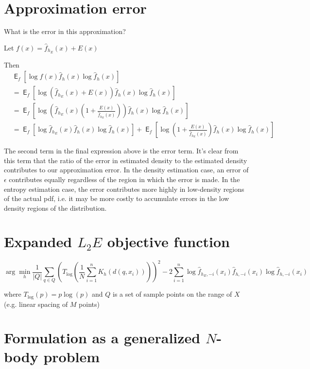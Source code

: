 \documentclass{article}
\DeclareMathOperator*{\E}{\mathsf{E}}
\begin{document}
  \section{Approximation error}

  What is the error in this approximation?

  Let $ f(x) = \hat{f}_{h_E}(x) + E(x) $

  Then
  \begin{align*}
    & \E_f[ \log f(x) \hat{f}_h(x) \log \hat{f}_h(x)]\\
    & = \E_f[ \log (\hat{f}_{h_E}(x) + E(x)) \hat{f}_h(x) \log \hat{f}_h(x)]\\
    & = \E_f[ \log \left( \hat{f}_{h_E}(x) (1 + \frac{E(x)}{\hat{f}_{h_E}(x)}) \right) \hat{f}_h(x) \log \hat{f}_h(x)]\\
    & = \E_f[ \log \hat{f}_{h_E}(x) \hat{f}_h(x) \log \hat{f}_h(x)] + \E_f[ \log \left( 1 + \frac{E(x)}{\hat{f}_{h_E}(x)} \right) \hat{f}_h(x) \log \hat{f}_h(x)]
  \end{align*}

  The second term in the final expression above is the error term. It's clear from this term that the ratio of the error in estimated density to the estimated density contributes to our approximation error. In the density estimation case, an error of $ \epsilon $ contributes equally regardless of the region in which the error is made. In the entropy estimation case, the error contributes more highly in low-density regions of the actual pdf, i.e. it may be more costly to accumulate errors in the low density regions of the distribution.


  \section{Expanded $L_2E$ objective function}

  \begin{displaymath}
    \arg \min_h \frac{1}{\vert Q \vert} \sum_{q \in Q} \left( T_{\log} \left( \frac{1}{N} \sum_{i=1}^n K_h(d(q,x_i)) \right) \right) ^2 - 2 \sum_{i=1}^n \log \hat{f}_{h_E,-i}(x_i) \hat{f}_{h,-i}(x_i) \log \hat{f}_{h,-i}(x_i)
  \end{displaymath}

  where $ T_{\log}(p) = p \log(p) $ and $Q$ is a set of sample points on the range of $X$ (e.g. linear spacing of $M$ points)


  \section{Formulation as a generalized $N$-body problem}
\end{document}
